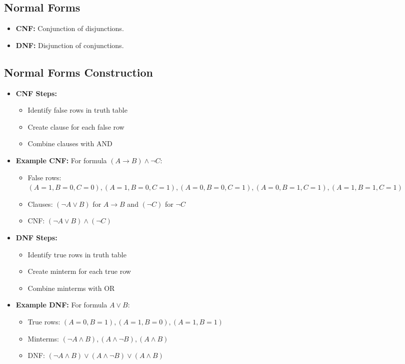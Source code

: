 \documentclass[a4paper,landscape]{article}
\begin{document}
\begin{multicols*}{5}
\subsection*{Normal Forms}
\begin{itemize}[leftmargin=*, itemsep=0pt]
    \item \textbf{CNF:} Conjunction of disjunctions.
    \item \textbf{DNF:} Disjunction of conjunctions.
\end{itemize}

\subsection*{Normal Forms Construction}
\begin{itemize}[leftmargin=*, itemsep=0pt]
    \item \textbf{CNF Steps:}
    \begin{itemize}[leftmargin=*, itemsep=0pt]
        \item Identify false rows in truth table
        \item Create clause for each false row
        \item Combine clauses with AND
    \end{itemize}
    \item \textbf{Example CNF:} For formula $(A \rightarrow B) \wedge \neg C$:
    \begin{itemize}[leftmargin=*, itemsep=0pt]
        \item False rows: $(A=1,B=0,C=0), (A=1,B=0,C=1), (A=0,B=0,C=1), (A=0,B=1,C=1), (A=1,B=1,C=1)$
        \item Clauses: $(\neg A \vee B)$ for $A \rightarrow B$ and $(\neg C)$ for $\neg C$
        \item CNF: $(\neg A \vee B) \wedge (\neg C)$
    \end{itemize}
    \item \textbf{DNF Steps:}
    \begin{itemize}[leftmargin=*, itemsep=0pt]
        \item Identify true rows in truth table
        \item Create minterm for each true row
        \item Combine minterms with OR
    \end{itemize}
    \item \textbf{Example DNF:} For formula $A \vee B$:
    \begin{itemize}[leftmargin=*, itemsep=0pt]
        \item True rows: $(A=0,B=1), (A=1,B=0), (A=1,B=1)$
        \item Minterms: $(\neg A \wedge B), (A \wedge \neg B), (A \wedge B)$
        \item DNF: $(\neg A \wedge B) \vee (A \wedge \neg B) \vee (A \wedge B)$
    \end{itemize}
\end{itemize}


\end{multicols*}
\end{document}
